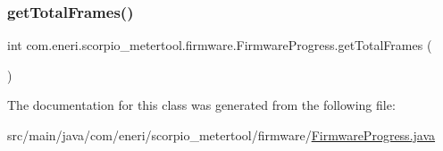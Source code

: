 \subsubsection{\texorpdfstring{get\+Total\+Frames()}{getTotalFrames()}}
{\footnotesize\ttfamily int com.\+eneri.\+scorpio\+\_\+metertool.\+firmware.\+Firmware\+Progress.\+get\+Total\+Frames (\begin{DoxyParamCaption}{ }\end{DoxyParamCaption})}



The documentation for this class was generated from the following file\+:\begin{DoxyCompactItemize}
\item 
src/main/java/com/eneri/scorpio\+\_\+metertool/firmware/\hyperlink{_firmware_progress_8java}{Firmware\+Progress.\+java}\end{DoxyCompactItemize}
